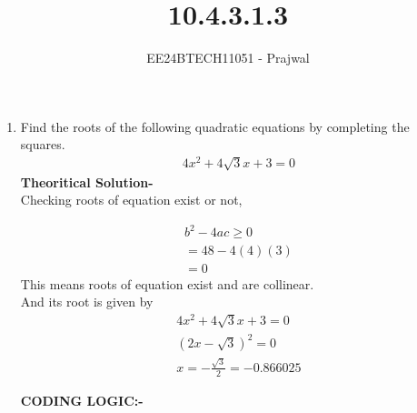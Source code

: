 \documentclass[journal]{IEEEtran}
\numberwithin{equation}{enumi}
\numberwithin{figure}{enumi}
\begin{document}

\title{10.4.3.1.3}
\author{EE24BTECH11051 - Prajwal}
{\let\newpage\relax\maketitle}
\begin{enumerate}
\item Find the roots of the following quadratic equations by completing the squares.
\begin{align}
4x^2 + 4\sqrt{3}x + 3 = 0
\end{align}
\textbf{Theoritical Solution-}\\
Checking roots of equation exist or not,

\begin{align}
b^2 - 4ac \geq 0 \\
= 48 - 4(4)(3)\\
= 0 
\end{align}
This means roots of equation exist and are collinear.\\
And its root is given by 
\begin{align}
4x^2 + 4\sqrt{3}x + 3 = 0 \\
(2x-\sqrt{3})^2 = 0 \\
x = -\frac{\sqrt{3}}{2}=-0.866025
\end{align} 

\textbf{CODING LOGIC:-}



\end{enumerate}
\end{document}
